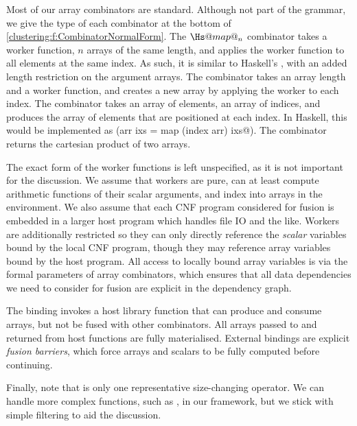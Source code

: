 Most of our array combinators are standard.
Although not part of the grammar, we give the type of each combinator at the bottom of \cref{clustering:f:CombinatorNormalForm}.
The $\Hs@map@_n$ combinator takes a worker function, $n$ arrays of the same length, and applies the worker function to all elements at the same index.
As such, it is similar to Haskell's \Hs@zipWith@, with an added length restriction on the argument arrays.
The \Hs@generate@ combinator takes an array length and a worker function, and creates a new array by applying the worker to each index.
The \Hs@gather@ combinator takes an array of elements, an array of indices, and produces the array of elements that are positioned at each index.
In Haskell, this would be implemented as (\Hs@gather arr ixs = map (index arr) ixs@).
The \Hs@cross@ combinator returns the cartesian product of two arrays. 

The exact form of the worker functions is left unspecified, as it is not important for the discussion.
We assume that workers are pure, can at least compute arithmetic functions of their scalar arguments, and index into arrays in the environment.
We also assume that each CNF program considered for fusion is embedded in a larger host program which handles file IO and the like.
Workers are additionally restricted so they can only directly reference the \emph{scalar} variables bound by the local CNF program, though they may reference array variables bound by the host program.
All access to locally bound array variables is via the formal parameters of array combinators, which ensures that all data dependencies we need to consider for fusion are explicit in the dependency graph.

The \Hs@external@ binding invokes a host library function that can produce and consume arrays, but not be fused with other combinators.
All arrays passed to and returned from host functions are fully materialised.
External bindings are explicit \emph{fusion barriers}, which force arrays and scalars to be fully computed before continuing. 

Finally, note that \Hs@filter@ is only one representative size-changing operator.
We can handle more complex functions, such as \Hs@unfold@, in our framework, but we stick with simple filtering to aid the discussion.


